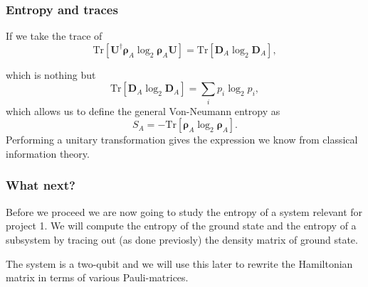 \documentclass{beamer}
\begin{document}
\begin{frame}
\frametitle{Entropy and traces}

If we take the trace of 
\[
\mathrm{Tr}[\bm{U}^{\dagger}\bm{\rho}_A\log_2{\bm{\rho}_A}\bm{U}]=\mathrm{Tr}[\bm{D}_A \log_2{\bm{D}_A}],
\]

which is nothing but
\[
\mathrm{Tr}[\bm{D}_A \log_2{\bm{D}_A}]=\sum_i p_i\log_2{p_i},
\]
which allows us to define the general Von-Neumann entropy as
\[
S_A=-\mathrm{Tr}[\bm{\rho}_A\log_2{\bm{\rho}_A}].
\]
Performing a unitary transformation gives the expression we know from classical information theory.
\end{frame}

\begin{frame}
\frametitle{What next?}

Before we proceed we are now going to study the entropy of a system
relevant for project 1.  We will compute the entropy of the ground
state and the entropy of a subsystem by tracing out (as done
previosly) the density matrix of ground state.

The system is a two-qubit and we will use this later to rewrite the
Hamiltonian matrix in terms of various Pauli-matrices.
\end{frame}
\end{document}
